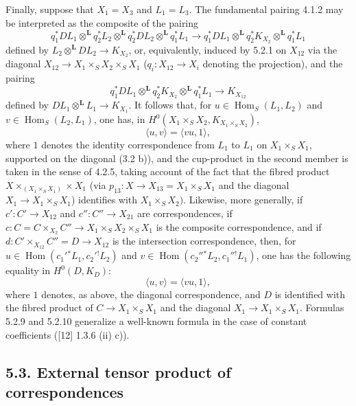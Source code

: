 \documentclass[11pt]{article}
\DeclareMathOperator{\Hom}{Hom}
\providecommand{\Hom}{\operatorname{Hom}}
\providecommand{\Hom}{\operatorname{Hom}}
\begin{document}
Finally, suppose that $X_1=X_3$ and $L_1=L_3$. The fundamental pairing 4.1.2 may be interpreted as the composite of the pairing
\begin{equation}
\tag{5.2.7}
q_1^*DL_1\otimes^{\mathbf L}q_2^*L_2\otimes^{\mathbf L}q_2^*DL_2\otimes^{\mathbf L}q_1^*L_1
\longrightarrow
q_1^*DL_1\otimes^{\mathbf L}q_2^*K_{X_2}\otimes^{\mathbf L}q_1^*L_1
\end{equation}
defined by $L_2\otimes^{\mathbf L}DL_2\to K_{X_2}$, or, equivalently, induced by 5.2.1 on $X_{12}$ via the diagonal $X_{12}\to X_1\times_SX_2\times_SX_1$ ($q_i:X_{12}\to X_i$ denoting the projection), and the pairing
\begin{equation}
\tag{5.2.8}
q_1^*DL_1\otimes^{\mathbf L}q_2^*K_{X_2}\otimes^{\mathbf L}q_1^*L_1\longrightarrow K_{X_{12}}
\end{equation}
defined by $DL_1\otimes^{\mathbf L}L_1\to K_{X_1}$. It follows that, for $u\in\Hom_S(L_1,L_2)$ and $v\in\Hom_S(L_2,L_1)$, one has, in $H^0(X_1\times_SX_2,K_{X_1\times_SX_2})$,
\begin{equation}
\tag{5.2.9}
\langle u,v\rangle=\langle vu,1\rangle,
\end{equation}
where $1$ denotes the identity correspondence from $L_1$ to $L_1$ on $X_1\times_SX_1$, supported on the diagonal (3.2 b)), and the cup-product in the second member is taken in the sense of 4.2.5, taking account of the fact that the fibred product $X\times_{(X_1\times_SX_1)}\times X_1$ (via $p_{13}:X\to X_{13}=X_1\times_SX_1$ and the diagonal $X_1\to X_1\times_SX_1$) identifies with $X_1\times_SX_2)$. Likewise, more generally, if $c':C'\to X_{12}$ and $c'':C''\to X_{21}$ are correspondences, if $c:C=C\times_{X_2}C''\to X_1\times_SX_2\times_SX_1$ is the composite correspondence, and if $d:C'\times_{X_{12}}C''=D\to X_{12}$ is the intersection correspondence, then, for $u\in\Hom(c_1'{}^*L_1,c_2'{}^!L_2)$ and $v\in\Hom(c_2''{}^*L_2,c_1''{}^!L_1)$, one has the following equality in $H^0(D,K_D)$:
\begin{equation}
\tag{5.2.10}
\langle u,v\rangle=\langle vu,1\rangle,
\end{equation}
where $1$ denotes, as above, the diagonal correspondence, and $D$ is identified with the fibred product of $C\to X_1\times_SX_1$ and the diagonal $X_1\to X_1\times_SX_1$. Formulas 5.2.9 and 5.2.10 generalize a well-known formula in the case of constant coefficients ([12] 1.3.6 (ii) c)).

\subsection*{5.3. External tensor product of correspondences}
\end{document}
